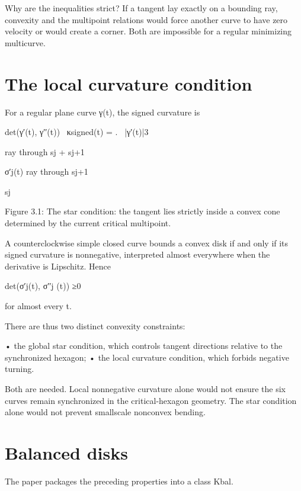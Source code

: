 Why are the inequalities strict? If a tangent lay exactly on a bounding ray, convexity and the multipoint relations would force another curve to have zero velocity or would create a corner. Both are impossible for a regular minimizing multicurve.


\section{The local curvature condition}

For a regular plane curve γ(t), the signed curvature is


\begin{displaytext}
det(γ′(t), γ′′(t)) \
κsigned(t) = . \
|γ′(t)|3
\end{displaytext}

ray through sj + sj+1


σ′j(t) ray through sj+1


sj


\begin{figureplaceholder}
Figure 3.1: The star condition: the tangent lies strictly inside a convex cone determined by the current critical multipoint.
\end{figureplaceholder}

A counterclockwise simple closed curve bounds a convex disk if and only if its signed curvature is nonnegative, interpreted almost everywhere when the derivative is Lipschitz. Hence


\begin{displaytext}
det(σ′j(t), σ′′j (t)) ≥0
\end{displaytext}

for almost every t.


There are thus two distinct convexity constraints:


• the global star condition, which controls tangent directions relative to the synchronized hexagon; • the local curvature condition, which forbids negative turning.


Both are needed. Local nonnegative curvature alone would not ensure the six curves remain synchronized in the critical-hexagon geometry. The star condition alone would not prevent smallscale nonconvex bending.


\section{Balanced disks}

The paper packages the preceding properties into a class Kbal.


